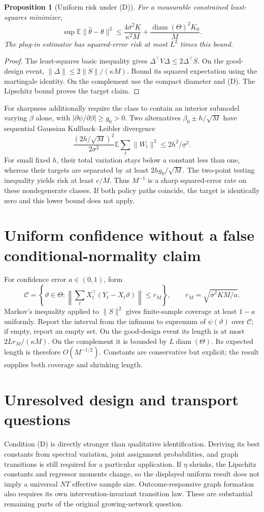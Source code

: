 \documentclass[11pt]{article}
\newtheorem{proposition}{Proposition}
\newcommand{\E}{\mathbb E}
\begin{document}
\begin{proposition}[Uniform risk under (D)]
For a measurable constrained least-squares minimizer,
\[
 \sup\E\|\widehat\theta-\theta\|^2
 \leq\frac{4\overline\sigma^2K}{\kappa^2M}
 +\frac{\operatorname{diam}(\Theta)^2K_0}{M}.
\]
The plug-in estimator has squared-error risk at most $L^2$ times this bound.
\end{proposition}
\begin{proof}
The least-squares basic inequality gives $\Delta^\top V\Delta\leq2\Delta^\top S$. On the good-design event, $\|\Delta\|\leq2\|S\|/(\kappa M)$. Bound its squared expectation using the martingale identity. On the complement use the compact diameter and (D). The Lipschitz bound proves the target claim.
\end{proof}

For sharpness additionally require the class to contain an interior submodel varying $\beta$ alone, with $|\partial\psi/\partial\beta|\geq g_0>0$. Two alternatives $\beta_0\pm h/\sqrt M$ have sequential Gaussian Kullback--Leibler divergence
\[
 \frac{(2h/\sqrt M)^2}{2\sigma^2}
 \E\sum_t\|W_t\|^2\leq2h^2/\underline\sigma^2.
\]
For small fixed $h$, their total variation stays below a constant less than one, whereas their targets are separated by at least $2hg_0/\sqrt M$. The two-point testing inequality yields risk at least $c/M$. Thus $M^{-1}$ is a sharp squared-error rate on these nondegenerate classes. If both policy paths coincide, the target is identically zero and this lower bound does not apply.

\section*{Uniform confidence without a false conditional-normality claim}
For confidence error $a\in(0,1)$, form
\[
 \mathcal C=\left\{\vartheta\in\Theta:
 \left\|\sum_tX_t^\top(Y_t-X_t\vartheta)\right\|
 \leq r_M\right\},\qquad
 r_M=\sqrt{\overline\sigma^2KM/a}.
\]
Markov's inequality applied to $\|S\|^2$ gives finite-sample coverage at least $1-a$ uniformly. Report the interval from the infimum to supremum of $\psi(\vartheta)$ over $\mathcal C$; if empty, report an empty set. On the good-design event its length is at most $2Lr_M/(\kappa M)$. On the complement it is bounded by $L\operatorname{diam}(\Theta)$. Its expected length is therefore $O(M^{-1/2})$. Constants are conservative but explicit; the result supplies both coverage and shrinking length.

\section*{Unresolved design and transport questions}
Condition (D) is directly stronger than qualitative identification. Deriving its best constants from spectral variation, joint assignment probabilities, and graph transitions is still required for a particular application. If $\eta$ shrinks, the Lipschitz constants and regressor moments change, so the displayed uniform result does not imply a universal $NT$ effective sample size. Outcome-responsive graph formation also requires its own intervention-invariant transition law. These are substantial remaining parts of the original growing-network question.
\end{document}
